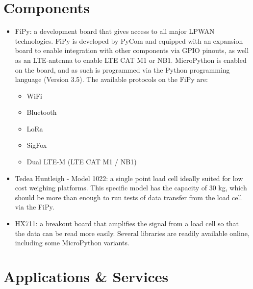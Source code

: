 \iffalse
\begin{itemize}
  \item Have a specific background or spread it out
  \item May be necessary to introduce certain things
\end{itemize}
\fi

\section{Components}
\begin{itemize}
\item FiPy: a development board that gives access to all major LPWAN technologies. FiPy is developed by PyCom and equipped with an expansion board to enable integration with other components via GPIO pinouts, as well as an LTE-antenna to enable LTE CAT M1 or NB1. MicroPython is enabled on the board, and as such is programmed via the Python programming language (Version 3.5). The available protocols on the FiPy are:
  \begin{itemize}
    \item WiFi
    \item Bluetooth
    \item LoRa
    \item SigFox
    \item Dual LTE-M (LTE CAT M1 / NB1)
  \end{itemize}
  
\item Tedea Huntleigh - Model 1022: a single point load cell ideally suited for low cost weighing platforms. This specific model has the capacity of 30 kg, which should be more than enough to run tests of data transfer from the load cell via the FiPy.

\item HX711: a breakout board that amplifies the signal from a load cell so that the data can be read more easily. Several libraries are readily available online, including some MicroPython variants. 
\end{itemize}




\section{Applications \& Services}
